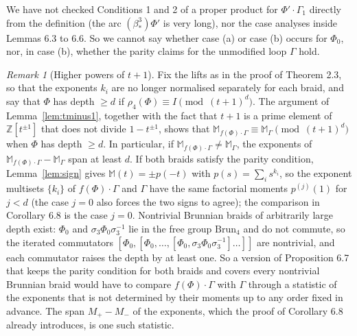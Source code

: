 \documentclass[11pt]{amsart}
\theoremstyle{remark}
\newtheorem{remark}[lemma]{Remark}
\newcommand{\M}{\mathbb{M}}
\newcommand{\Brun}{\mathrm{Brun}}
\newcommand{\bs}{\beta^3_*}
\begin{document}
We have not checked Conditions 1 and 2 of a proper product for $\Phi'\cdot\Gamma_1$ directly from the definition (the arc $(\bs)\Phi'$ is very long), nor the case analyses inside Lemmas 6.3 to 6.6. So we cannot say whether case (a) or case (b) occurs for $\Phi_0$, nor, in case (b), whether the parity claims for the unmodified loop $\Gamma$ hold.

\begin{remark}[Higher powers of $t+1$]
Fix the lifts as in the proof of Theorem 2.3, so that the exponents $k_i$ are no longer normalised separately for each braid, and say that $\Phi$ has depth $\ge d$ if $\rho_4(\Phi)\equiv I\pmod{(t+1)^d}$. The argument of Lemma~\ref{lem:tminus1}, together with the fact that $t+1$ is a prime element of $\mathbb{Z}[t^{\pm1}]$ that does not divide $1-t^{\pm1}$, shows that $\M_{f(\Phi)\cdot\Gamma}\equiv\M_\Gamma\pmod{(t+1)^d}$ when $\Phi$ has depth $\ge d$. In particular, if $\M_{f(\Phi)\cdot\Gamma}\neq\M_\Gamma$, the exponents of $\M_{f(\Phi)\cdot\Gamma}-\M_\Gamma$ span at least $d$. If both braids satisfy the parity condition, Lemma~\ref{lem:sign} gives $\M(t)=\pm p(-t)$ with $p(s)=\sum_i s^{k_i}$, so the exponent multisets $\{k_i\}$ of $f(\Phi)\cdot\Gamma$ and $\Gamma$ have the same factorial moments $p^{(j)}(1)$ for $j<d$ (the case $j=0$ also forces the two signs to agree); the comparison in Corollary 6.8 is the case $j=0$. Nontrivial Brunnian braids of arbitrarily large depth exist: $\Phi_0$ and $\sigma_3\Phi_0\sigma_3^{-1}$ lie in the free group $\Brun_4$ and do not commute, so the iterated commutators $[\Phi_0,[\Phi_0,\dots,[\Phi_0,\sigma_3\Phi_0\sigma_3^{-1}]\dots]]$ are nontrivial, and each commutator raises the depth by at least one. So a version of Proposition 6.7 that keeps the parity condition for both braids and covers every nontrivial Brunnian braid would have to compare $f(\Phi)\cdot\Gamma$ with $\Gamma$ through a statistic of the exponents that is not determined by their moments up to any order fixed in advance. The span $M_+-M_-$ of the exponents, which the proof of Corollary 6.8 already introduces, is one such statistic.
\end{remark}
\end{document}
